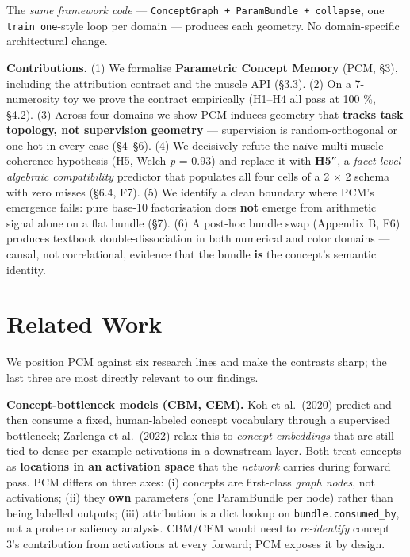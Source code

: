 The \emph{same framework code} --- \texttt{ConceptGraph\ +\ ParamBundle\ +\ collapse},
one \texttt{train\_one}-style loop per domain --- produces each geometry. No
domain-specific architectural change.

\textbf{Contributions.} (1) We formalise \textbf{Parametric Concept Memory}
(PCM, §3), including the attribution contract and the muscle API
(§3.3). (2) On a 7-numerosity toy we prove the contract empirically
(H1--H4 all pass at 100 \%, §4.2). (3) Across four domains we show PCM
induces geometry that \textbf{tracks task topology, not supervision
geometry} --- supervision is random-orthogonal or one-hot in every
case (§4--§6). (4) We decisively refute the naïve multi-muscle
coherence hypothesis (H5, Welch \emph{p} = 0.93) and replace it with
\textbf{H5″}, a \emph{facet-level algebraic compatibility} predictor that
populates all four cells of a 2 × 2 schema with zero misses (§6.4,
F7). (5) We identify a clean boundary where PCM's emergence fails:
pure base-10 factorisation does \textbf{not} emerge from arithmetic
signal alone on a flat bundle (§7). (6) A post-hoc bundle swap
(Appendix B, F6) produces textbook double-dissociation in both
numerical and color domains --- causal, not correlational, evidence
that the bundle \textbf{is} the concept's semantic identity.

\medskip

\section{Related Work}

We position PCM against six research lines and make the contrasts
sharp; the last three are most directly relevant to our findings.

\textbf{Concept-bottleneck models (CBM, CEM).} Koh et al.~(2020) predict
and then consume a fixed, human-labeled concept vocabulary through
a supervised bottleneck; Zarlenga et al.~(2022) relax this to
\emph{concept embeddings} that are still tied to dense per-example
activations in a downstream layer. Both treat concepts as
\textbf{locations in an activation space} that the \emph{network} carries
during forward pass. PCM differs on three axes: (i) concepts are
first-class \emph{graph nodes}, not activations; (ii) they \textbf{own}
parameters (one ParamBundle per node) rather than being labelled
outputs; (iii) attribution is a dict lookup on
\texttt{bundle.consumed\_by}, not a probe or saliency analysis. CBM/CEM
would need to \emph{re-identify} concept 3's contribution from activations
at every forward; PCM exposes it by design.


